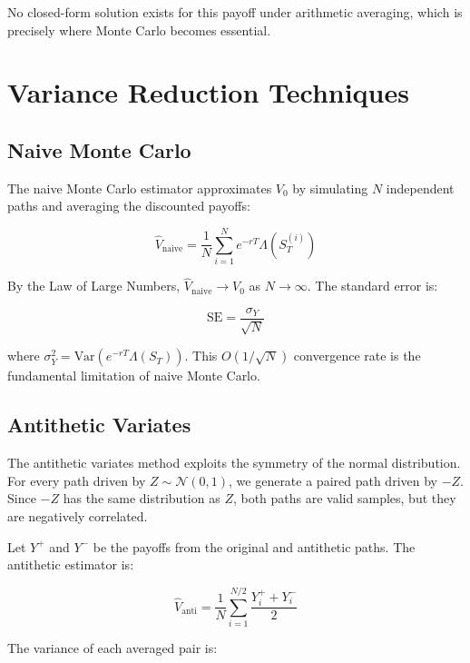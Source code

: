 \documentclass[12pt]{article}
\begin{document}
No closed-form solution exists for this payoff under arithmetic averaging,
which is precisely where Monte Carlo becomes essential.

\section{Variance Reduction Techniques}

\subsection{Naive Monte Carlo}

The naive Monte Carlo estimator approximates $V_0$ by simulating $N$
independent paths and averaging the discounted payoffs:

\begin{equation}
    \hat{V}_{\text{naive}} = \frac{1}{N} \sum_{i=1}^{N} e^{-rT} \Lambda(S_T^{(i)})
\end{equation}

By the Law of Large Numbers, $\hat{V}_{\text{naive}} \to V_0$ as
$N \to \infty$. The standard error is:

\begin{equation}
    \text{SE} = \frac{\sigma_Y}{\sqrt{N}}
\end{equation}

where $\sigma_Y^2 = \text{Var}(e^{-rT}\Lambda(S_T))$. This $O(1/\sqrt{N})$
convergence rate is the fundamental limitation of naive Monte Carlo.

\subsection{Antithetic Variates}

The antithetic variates method exploits the symmetry of the normal
distribution. For every path driven by $Z \sim \mathcal{N}(0,1)$, we
generate a paired path driven by $-Z$. Since $-Z$ has the same distribution
as $Z$, both paths are valid samples, but they are negatively correlated.

Let $Y^+$ and $Y^-$ be the payoffs from the original and antithetic paths.
The antithetic estimator is:

\begin{equation}
    \hat{V}_{\text{anti}} = \frac{1}{N} \sum_{i=1}^{N/2}
    \frac{Y_i^+ + Y_i^-}{2}
\end{equation}

The variance of each averaged pair is:
\end{document}

